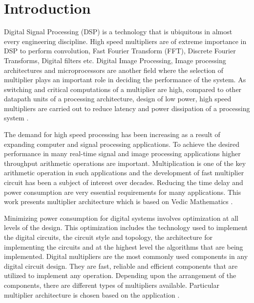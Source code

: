 \chapter{Introduction}
\label{ChapterIntroduction}
Digital Signal Processing (DSP) is a technology that is ubiquitous in almost every engineering discipline. High speed multipliers are of extreme importance in DSP to perform convolution, Fast Fourier Transform (FFT), Discrete Fourier Transforms, Digital filters etc. Digital Image Processing, Image processing architectures and microprocessors are another field where the selection of multiplier plays an important role in deciding the performance of the system.
As switching and critical computations of a multiplier are high, compared to other datapath units of a processing architecture, design of low power, high speed multipliers are carried out to reduce latency and power dissipation of a processing system \cite{r10}.

The demand for high speed processing has been increasing as a result of expanding computer and signal processing applications. To achieve the desired performance in many real-time signal and image processing applications higher throughput arithmetic operations are important. Multiplication is one of the key arithmetic operation in such applications and the development of fast multiplier circuit has been a subject of interest over decades. Reducing the time delay and power consumption are very essential requirements for many applications. This work presents multiplier architecture which is based on Vedic Mathematics \cite{r4}.

Minimizing power consumption for digital systems involves optimization at all levels of the design. This optimization includes the technology used to implement the digital circuits, the circuit style and topology, the architecture for implementing the circuits and at the highest level the algorithms that are being implemented. Digital multipliers are the most commonly used components in any digital circuit design. They are fast, reliable and efficient components that are utilized to implement any operation. Depending upon the arrangement of the components, there are different types of multipliers available. Particular multiplier architecture is chosen based on the application \cite{r10}.

